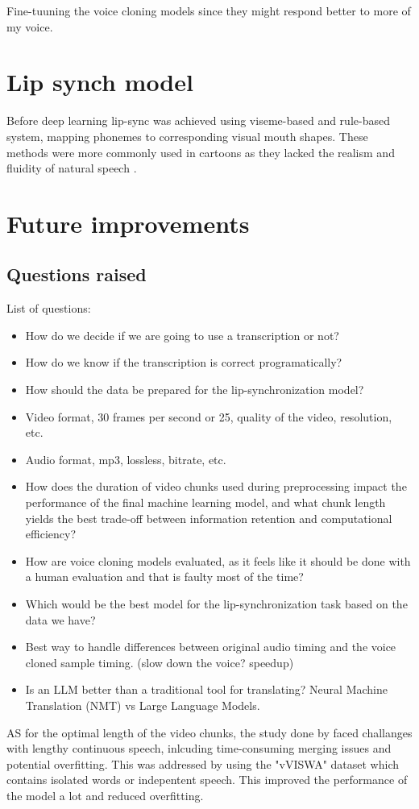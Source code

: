 \documentclass[12pt]{article}
\begin{document}
Fine-tuuning the voice cloning models since they might respond better to more of my voice.

\section{Lip synch model}
Before deep learning lip-sync was achieved using viseme-based and rule-based system, mapping phonemes to corresponding visual mouth shapes. These methods were more commonly used in cartoons as they lacked the realism and fluidity of natural speech \cite{automatic-lip-synch-methods-in-games}\cite{https://doi.org/10.1002/vis.4340020404}\cite{computers14010007}. 

\section{Future improvements}



\subsection{Questions raised}
List of questions:
\begin{itemize}
    \item How do we decide if we are going to use a transcription or not?
    \item How do we know if the transcription is correct programatically?
    \item How should the data be prepared for the lip-synchronization model?
    \item Video format, 30 frames per second or 25, quality of the video, resolution, etc.
    \item Audio format, mp3, lossless, bitrate, etc.
    \item How does the duration of video chunks used during preprocessing impact the performance of the final machine learning model, and what chunk length yields the best trade-off between information retention and computational efficiency?
    \item How are voice cloning models evaluated, as it feels like it should be done with a human evaluation and that is faulty most of the time?
    \item Which would be the best model for the lip-synchronization task based on the data we have?
    \item Best way to handle differences between original audio timing and the voice cloned sample timing. (slow down the voice? speedup)
    \item Is an LLM better than a traditional tool for translating? Neural Machine Translation (NMT) vs Large Language Models.
\end{itemize}
AS for the optimal length of the video chunks, the study done by \cite{PAWAR2024100084} faced challanges with lengthy continuous speech, inlcuding time-consuming merging issues and potential overfitting. This was addressed by using the "vVISWA" dataset which contains isolated words or indepentent speech. This improved the performance of the model a lot and reduced overfitting.
\end{document}
